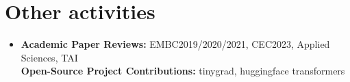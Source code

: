 \documentclass[letterpaper,10pt]{article}
\begin{document}
\section{Other activities}
\begin{itemize}[leftmargin=0.15in, label={}]
  \item{
  \textbf{Academic Paper Reviews: }{EMBC2019/2020/2021, CEC2023, Applied Sciences, TAI} \\
  \textbf{Open-Source Project Contributions: }{tinygrad, huggingface transformers} \\
  }
\end{itemize}

\end{document}
